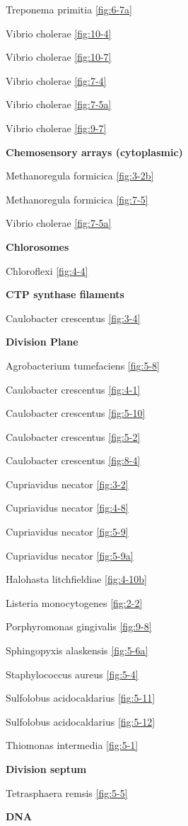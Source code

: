\documentclass[]{tufte-book}
\begin{document}
Treponema primitia \ref{fig:6-7a}

Vibrio cholerae \ref{fig:10-4}

Vibrio cholerae \ref{fig:10-7}

Vibrio cholerae \ref{fig:7-4}

Vibrio cholerae \ref{fig:7-5a}

Vibrio cholerae \ref{fig:9-7}

\textbf{Chemosensory arrays (cytoplasmic)}

Methanoregula formicica \ref{fig:3-2b}

Methanoregula formicica \ref{fig:7-5}

Vibrio cholerae \ref{fig:7-5a}

\textbf{Chlorosomes}

Chloroflexi \ref{fig:4-4}

\textbf{CTP synthase filaments}

Caulobacter crescentus \ref{fig:3-4}

\textbf{Division Plane}

Agrobacterium tumefaciens \ref{fig:5-8}

Caulobacter crescentus \ref{fig:4-1}

Caulobacter crescentus \ref{fig:5-10}

Caulobacter crescentus \ref{fig:5-2}

Caulobacter crescentus \ref{fig:8-4}

Cupriavidus necator \ref{fig:3-2}

Cupriavidus necator \ref{fig:4-8}

Cupriavidus necator \ref{fig:5-9}

Cupriavidus necator \ref{fig:5-9a}

Halohasta litchfieldiae \ref{fig:4-10b}

Listeria monocytogenes \ref{fig:2-2}

Porphyromonas gingivalis \ref{fig:9-8}

Sphingopyxis alaskensis \ref{fig:5-6a}

Staphylococcus aureus \ref{fig:5-4}

Sulfolobus acidocaldarius \ref{fig:5-11}

Sulfolobus acidocaldarius \ref{fig:5-12}

Thiomonas intermedia \ref{fig:5-1}

\textbf{Division septum}

Tetrasphaera remsis \ref{fig:5-5}

\textbf{DNA}
\end{document}
